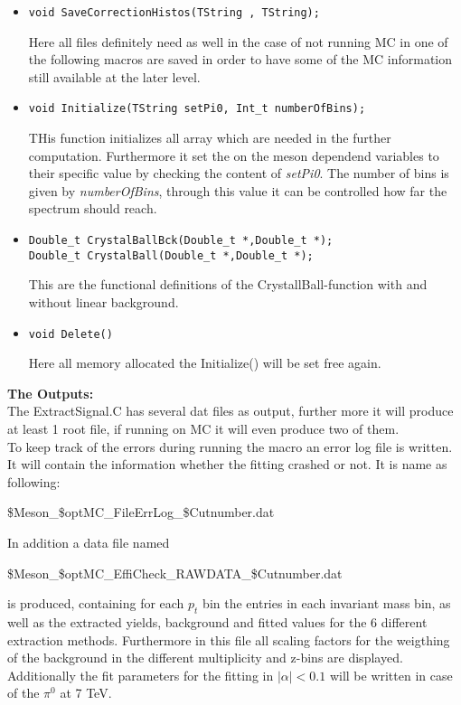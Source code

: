 \begin{itemize}
		\item \begin{lstlisting}
void SaveCorrectionHistos(TString , TString);
		      \end{lstlisting}
			Here all files definitely need as well in the case of not running MC in one of the following macros are saved in order to have some of the MC information still available at the later level.
		\item \begin{lstlisting} 
void Initialize(TString setPi0, Int_t numberOfBins);
		      \end{lstlisting}
			THis function initializes all array which are needed in the further computation. Furthermore it set the on the meson dependend variables to their specific value by checking the content of \textit{setPi0}. The number of bins is given by \textit{numberOfBins}, through this value it can be controlled how far the spectrum should reach.
		\item \begin{lstlisting}
Double_t CrystalBallBck(Double_t *,Double_t *);
Double_t CrystalBall(Double_t *,Double_t *);
		      \end{lstlisting}
		     This are the functional definitions of the CrystallBall-function with and without linear background.
		\item \begin{lstlisting}
void Delete()		       	
		      \end{lstlisting}
		     Here all memory allocated the Initialize() will be set free again. 
		\end{itemize}
		\textbf{The Outputs:}\\
		\noindent The ExtractSignal.C has several dat files as output, further more it will produce at least 1 root file, if running on MC it will even produce two of them.\\
		\noindent To keep track of the errors during running the macro an error log file is written. It will contain the information whether the fitting crashed or not. It is name as following:
		\begin{center}
		 	\$Meson\_\$optMC\_FileErrLog\_\$Cutnumber.dat
		\end{center}
		In addition a data file named 
		\begin{center}
		 	\$Meson\_\$optMC\_EffiCheck\_RAWDATA\_\$Cutnumber.dat
		\end{center}
		is produced, containing for each $p_t$ bin the entries in each invariant mass bin, as well as the extracted yields, background and fitted values for the 6 different extraction methods. Furthermore in this file all scaling factors for the weigthing of the background in the different multiplicity and z-bins are displayed. Additionally the fit parameters for the fitting in $|\alpha| < 0.1$ will be written in case of the $\pi^0$ at 7 TeV. \\
